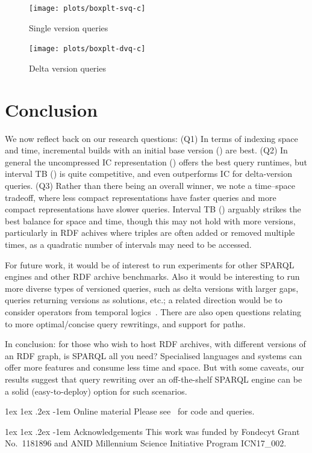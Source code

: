\documentclass[a4paper]{llncs}
\makeatletter
\renewcommand\paragraph{\@startsection{paragraph}{4}{\z@}%
	{1ex \@plus1ex \@minus.2ex}%
	{-1em}%
	{\normalfont\normalsize\itshape}}
\makeatother
\begin{document}
\begin{figure}[t]
\centering
\begin{minipage}{.5\textwidth}
  \centering
  \texttt{[image: plots/boxplt-svq-c]}
  \caption{Single version queries  \label{fig:svq}}
\end{minipage}%
\hfill
\begin{minipage}{.5\textwidth}
  \centering
  \texttt{[image: plots/boxplt-dvq-c]}
  \caption{Delta version queries   \label{fig:dvq}}
\end{minipage}
\end{figure}

\section{Conclusion}

We now reflect back on our research questions: (Q1) In terms of indexing space and time, incremental builds with an initial base version (\cbpd) are best. (Q2) In general the uncompressed IC representation (\ic) offers the best query runtimes, but interval TB (\tb) is quite competitive, and even outperforms IC for delta-version queries. (Q3) Rather than there being an overall winner, we note a time--space tradeoff, where less compact representations have faster queries and more compact representations have slower queries. Interval TB (\tb) arguably strikes the best balance for space and time, though this may not hold with more versions, particularly in RDF achives where triples are often added or removed multiple times, as a quadratic number of intervals may need to be accessed.

For future work, it would be of interest to run experiments for other SPARQL engines and other RDF archive benchmarks. Also it would be interesting to run more diverse types of versioned queries, such as delta versions with larger gaps, queries returning versions as solutions, etc.; a related direction would be to consider operators from temporal logics~\cite{Pnueli77}. There are also open questions relating to more optimal/concise query rewritings, and support for paths.

In conclusion: for those who wish to host RDF archives, with different versions of an RDF graph, is SPARQL all you need? Specialised languages and systems can offer more features and consume less time and space. But with some caveats, our results suggest that query rewriting over an off-the-shelf SPARQL engine can be a solid (easy-to-deploy) option for such scenarios.

\paragraph{Online material} Please see~\cite{online} for code and queries.

\paragraph{Acknowledgements} This work was funded by Fondecyt Grant No.\ 1181896 and ANID Millennium Science Initiative Program ICN17\_002.



\end{document}
